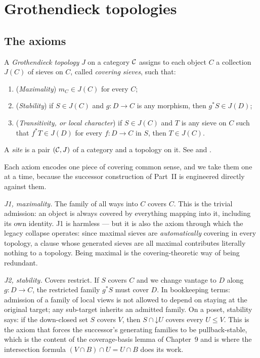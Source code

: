 \section{Grothendieck topologies}\label{ch03:sec:topologies}

\subsection{The axioms}\label{ch03:sec:axioms}

\begin{definition}\label{ch03:def:topology}
A \emph{Grothendieck topology} $J$ on a category $\mathcal{C}$ assigns to
each object $C$ a collection $J(C)$ of sieves on $C$, called
\emph{covering sieves}, such that:
\begin{enumerate}
\item[(J1)] (\emph{Maximality}) $m_C \in J(C)$ for every $C$;
\item[(J2)] (\emph{Stability}) if $S \in J(C)$ and $g : D \to C$ is
any morphism, then $g^* S \in J(D)$;
\item[(J3)] (\emph{Transitivity, or local character}) if
$S \in J(C)$ and $T$ is any sieve on $C$ such that
$f^* T \in J(D)$ for every $f : D \to C$ in $S$, then
$T \in J(C)$.
\end{enumerate}
A \emph{site} is a pair $(\mathcal{C}, J)$ of a category and a topology on
it. See \cite[Ch.~III]{maclane} and \cite{stacks00Z4}.
\end{definition}

Each axiom encodes one piece of covering common sense, and we take
them one at a time, because the successor construction of
Part~II is engineered directly against them.

\emph{J1, maximality.} The family of all ways into $C$ covers $C$.
This is the trivial admission: an object is always covered by
everything mapping into it, including its own identity. J1 is
harmless --- but it is also the axiom through which the legacy
collapse operates: since maximal sieves are \emph{automatically}
covering in every topology, a clause whose generated sieves are all
maximal contributes literally nothing to a topology. Being maximal
is the covering-theoretic way of being redundant.

\emph{J2, stability.} Covers restrict. If $S$ covers $C$ and we
change vantage to $D$ along $g : D \to C$, the restricted family
$g^* S$ must cover $D$. In bookkeeping terms: admission of a family
of local views is not allowed to depend on staying at the original
target; any sub-target inherits an admitted family. On a poset,
stability says: if the down-closed set $S$ covers $V$, then
$S \cap \mathord{\downarrow} U$ covers every $U \le V$. This is the
axiom that forces the successor's generating families to be
pullback-stable, which is the content of the coverage-basis lemma
of Chapter~9 and is where the intersection formula
$(V \cap B) \cap U = U \cap B$ does its work.

